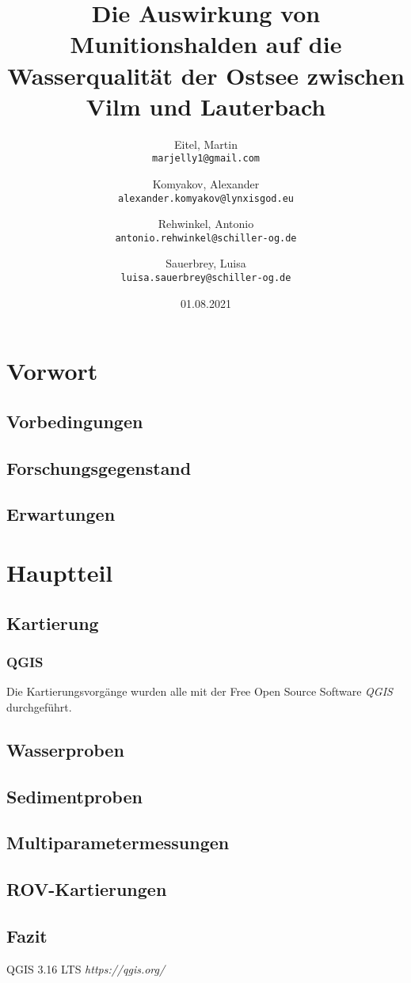 \documentclass[12pt,titlepage]{scrreprt}
\begin{document}
\begin{titlepage}
\title{Die Auswirkung von Munitionshalden auf die Wasserqualität der Ostsee zwischen Vilm und Lauterbach}
\date{01.08.2021}
\author{Eitel, Martin \\ \texttt{marjelly1@gmail.com}\and Komyakov, Alexander \\\texttt{alexander.komyakov@lynxisgod.eu} \\ \and Rehwinkel, Antonio \\ \texttt{antonio.rehwinkel@schiller-og.de} \\ \and Sauerbrey, Luisa \\ \texttt{luisa.sauerbrey@schiller-og.de}}
\maketitle
\end{titlepage}
\tableofcontents
\chapter{Vorwort}
\section{Vorbedingungen}
\section{Forschungsgegenstand}
\section{Erwartungen}
\chapter{Hauptteil}
\section{Kartierung}
    \subsection*{QGIS}
    Die Kartierungsvorgänge wurden alle mit der Free Open Source Software \emph{QGIS}\cite{qgis} durchgeführt.
    
\section{Wasserproben}
\section{Sedimentproben}
\section{Multiparametermessungen}
\section{ROV-Kartierungen}
\section{Fazit}

\begin{thebibliography}{9}
QGIS 3.16 LTS
\textit{https://qgis.org/}
\end{thebibliography}
\end{document}
